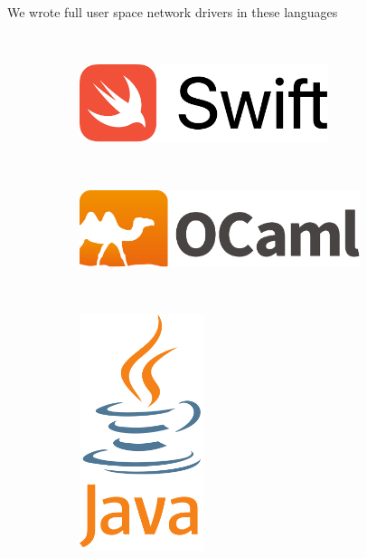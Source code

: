 \documentclass[NET,english,aspectratio=169,notitleframe]{tumbeamer}
\begin{document}
\begin{frame}{We wrote full user space network drivers in these languages}
\begin{figure}
    \centering
	\vspace{-1em}
    \begin{subfigure}[t]{0.2\textwidth}
        \centering
    \end{subfigure}
    ~ 
    \begin{subfigure}[t]{0.25\textwidth}
        \centering
        \includegraphics[width=0.8\textwidth]{pics/swift}
    \end{subfigure}
    ~ 
    \begin{subfigure}[t]{0.25\textwidth}
        \centering
        \includegraphics[width=0.9\textwidth]{pics/ocaml}
    \end{subfigure}
    ~
    \begin{subfigure}[t]{0.2\textwidth}
        \centering
        \includegraphics[width=0.4\textwidth]{pics/java}

\end{subfigure}
\end{figure}
\end{frame}
\end{document}
